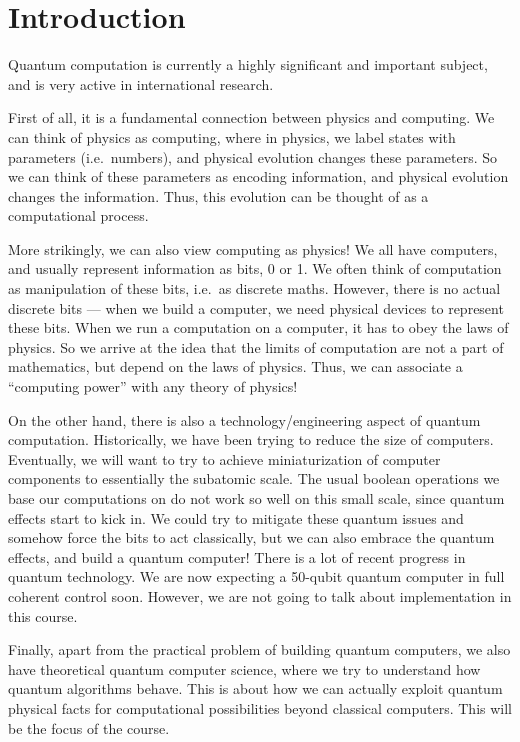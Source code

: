 \documentclass[a4paper]{article}
\begin{document}
\setcounter{section}{-1}
\section{Introduction}
Quantum computation is currently a highly significant and important subject, and is very active in international research.

First of all, it is a fundamental connection between physics and computing. We can think of physics as computing, where in physics, we label states with parameters (i.e.\ numbers), and physical evolution changes these parameters. So we can think of these parameters as encoding information, and physical evolution changes the information. Thus, this evolution can be thought of as a computational process.

More strikingly, we can also view computing as physics! We all have computers, and usually represent information as bits, 0 or 1. We often think of computation as manipulation of these bits, i.e.\ as discrete maths. However, there is no actual discrete bits --- when we build a computer, we need physical devices to represent these bits. When we run a computation on a computer, it has to obey the laws of physics. So we arrive at the idea that the limits of computation are not a part of mathematics, but depend on the laws of physics. Thus, we can associate a ``computing power'' with any theory of physics!

On the other hand, there is also a technology/engineering aspect of quantum computation. Historically, we have been trying to reduce the size of computers. Eventually, we will want to try to achieve miniaturization of computer components to essentially the subatomic scale. The usual boolean operations we base our computations on do not work so well on this small scale, since quantum effects start to kick in. We could try to mitigate these quantum issues and somehow force the bits to act classically, but we can also embrace the quantum effects, and build a quantum computer! There is a lot of recent progress in quantum technology. We are now expecting a 50-qubit quantum computer in full coherent control soon. However, we are not going to talk about implementation in this course.

Finally, apart from the practical problem of building quantum computers, we also have theoretical quantum computer science, where we try to understand how quantum algorithms behave. This is about how we can actually exploit quantum physical facts for computational possibilities beyond classical computers. This will be the focus of the course.
\end{document}
